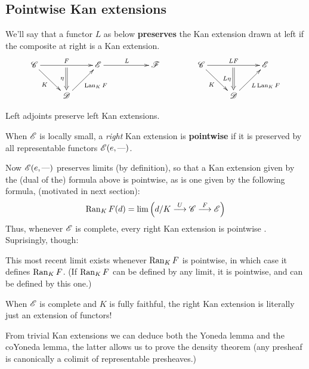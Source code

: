\documentclass[11pt]{article}
\begin{document}
\begin{2. Kan Extensions}
\subsection*{Pointwise Kan extensions}
We'll say that a functor $L$ as below \textbf{preserves} the Kan extension drawn at left if the composite at right is a Kan extension.
\[
\vcenter{\xymatrix{
\scrC\ar[rd]_-{K}\ar[rr]^-{F}_-{}="arF"&%
&%
\scrE\ar[rr]^L&&\scrF\\%
&%
\scrD\ar@{->}[ur]_{\Lan_KF}\ar@{=>}"arF";[]_-{\eta}&%
}}
\qquad \qquad 
\vcenter{\xymatrix{
\scrC\ar[rd]_-{K}
\ar[rr]^-{LF}_-{}="arF"&%
&%
\scrE\\%
&%
\scrD\ar@{->}[ur]_{L\Lan_KF}
\ar@{=>}"arF";[]_-{L\eta}&%
}}
\]
\begin{lem*}
Left adjoints preserve left Kan extensions.
\end{lem*}
\begin{defn*}
When $\mathscr{E}$ is locally small, a \textit{right} Kan extension is \textbf{pointwise} if it is preserved by all representable functors $\mathscr{E}(e,\textup{---} )$.
\end{defn*}
Now $\mathscr{E}(e,\textup{---} )$ preserves limits (by definition), so that a Kan extension given by the (dual of the) formula above is pointwise, as is one given by the following formula, (motivated in next section):
\[\operatorname{Ran}_KF(d)=\lim\left(d/K\overset{U}{\longrightarrow}\mathscr{C}\overset{F}{\longrightarrow}\mathscr{E}\right)\]
Thus, whenever $\mathscr{E}$ is complete, every right Kan extension is pointwise .
Suprisingly, though:
\begin{thm*}
This most recent limit exists whenever $\operatorname{Ran}_KF$ is pointwise, in which case it defines $\operatorname{Ran}_KF$. (If $\operatorname{Ran}_KF$ can be defined by any limit, it is pointwise, and can be defined by this one.)
\end{thm*}
\begin{thm*}
When $\mathscr{E}$ is complete and $K$ is fully faithful, the right Kan extension is literally just an extension of functors!
\end{thm*}
From trivial Kan extensions we can deduce both the Yoneda lemma and the coYoneda lemma, the latter allows us to prove the density theorem (any presheaf is canonically a colimit of representable presheaves.)

\end{2. Kan Extensions}
\end{document}
